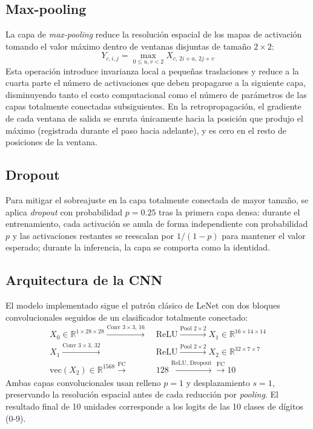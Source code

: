 \documentclass[conference]{IEEEtran}
\begin{document}
\subsection{Max-pooling}
La capa de \emph{max-pooling} reduce la resolución espacial de los mapas de activación tomando el valor máximo dentro de ventanas disjuntas de tamaño $2\times2$:
\begin{equation}
Y_{c,i,j} = \max_{0\le u,v <2} X_{c,\,2i+u,\,2j+v}
\end{equation}
Esta operación introduce invarianza local a pequeñas traslaciones y reduce a la cuarta parte el número de activaciones que deben propagarse a la siguiente capa, disminuyendo tanto el costo computacional como el número de parámetros de las capas totalmente conectadas subsiguientes. En la retropropagación, el gradiente de cada ventana de salida se enruta únicamente hacia la posición que produjo el máximo (registrada durante el paso hacia adelante), y es cero en el resto de posiciones de la ventana.

\subsection{Dropout}
Para mitigar el sobreajuste en la capa totalmente conectada de mayor tamaño, se aplica \emph{dropout} \cite{srivastava2014dropout} con probabilidad $p=0.25$ tras la primera capa densa: durante el entrenamiento, cada activación se anula de forma independiente con probabilidad $p$ y las activaciones restantes se reescalan por $1/(1-p)$ para mantener el valor esperado; durante la inferencia, la capa se comporta como la identidad.

\subsection{Arquitectura de la CNN}
El modelo implementado sigue el patrón clásico de LeNet \cite{lecun1998mnist} con dos bloques convolucionales seguidos de un clasificador totalmente conectado:
\begin{align}
\nonumber X_0 \in \mathbb{R}^{1\times28\times28} \xrightarrow{\text{Conv }3\times3,\,16} &\;\mathrm{ReLU} \xrightarrow{\text{Pool }2\times2} X_1 \in \mathbb{R}^{16\times14\times14} \\
\nonumber X_1 \xrightarrow{\text{Conv }3\times3,\,32} &\;\mathrm{ReLU} \xrightarrow{\text{Pool }2\times2} X_2 \in \mathbb{R}^{32\times7\times7} \\
\nonumber \mathrm{vec}(X_2)\in\mathbb{R}^{1568} \xrightarrow{\text{FC}} &\;128 \xrightarrow{\mathrm{ReLU},\,\mathrm{Dropout}} \xrightarrow{\text{FC}} 10
\end{align}
Ambas capas convolucionales usan relleno $p=1$ y desplazamiento $s=1$, preservando la resolución espacial antes de cada reducción por \emph{pooling}. El resultado final de 10 unidades corresponde a los logits de las 10 clases de dígitos (0-9).
\end{document}
